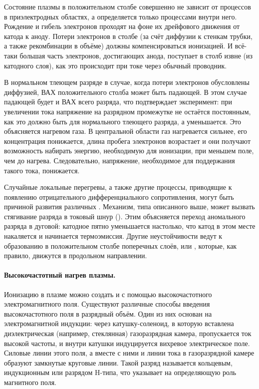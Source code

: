 Состояние плазмы в положительном столбе совершенно не зависит от процессов в
приэлектродных областях, а определяется
только процессами внутри него. Рождение и гибель электронов проходят на фоне их
дрейфового движения от катода к аноду.
Потери электронов в столбе (за счёт диффузии к стенкам трубки, а также
рекомбинации в объёме) должны компенсироваться
ионизацией. И всё-таки большая часть электронов, достигающих анода, поступает в
столб извне (из катодного слоя), как это
происходит при токе через обычный проводник.

В нормальном тлеющем разряде в случае, когда потери электронов обусловлены
диффузией, ВАХ положительного столба может
быть падающей. В этом случае падающей будет и ВАХ всего разряда, что
подтверждает эксперимент: при увеличении тока
напряжение на разрядном промежутке не остаётся постоянным, как это должно быть
для нормального тлеющего разряда, а
уменьшается.
Это объясняется нагревом газа. В центральной области газ нагревается сильнее,
его концентрация понижается, длина пробега
электронов возрастает и они получают возможность набирать энергию, необходимую
для ионизации, при меньшем поле, чем до
нагрева. Следовательно, напряжение, необходимое для поддержания такого тока,
понижается.

Случайные локальные перегревы, а также другие процессы, приводящие к появлению
отрицательного дифференциального
сопротивления, могут быть причиной развития различных
. Механизм, типа описанного выше, может
вызвать стягивание разряда в токовый шнур (). Этим
объясняется переход аномального разряда в дуговой:
катодное пятно уменьшается настолько, что катод в этом месте накаляется и
начинается термоэмиссия. Другие неустойчивости
ведут к образованию в положительном столбе поперечных слоёв, или
, которые, как правило, движутся в
продольном направлении.

\paragraph{Высокочастотный нагрев плазмы.}
Ионизацию в плазме можно создать и с помощью высокочастотного электромагнитного
поля. Существуют различные способы
введения высокочастотного поля в разрядный объём. Один из них основан на
электромагнитной индукции: через
катушку-соленоид, в которую вставлена диэлектрическая (например, стеклянная)
газоразрядная камера, пропускается ток
высокой частоты, и внутри катушки индуцируется вихревое электрическое поле.
Силовые линии этого поля, а вместе с ними и
линии тока в газоразрядной камере образуют замкнутые круговые линии. Такой
разряд называется кольцевым, индукционным или
разрядом H-типа, что указывает на определяющую роль магнитного поля.

